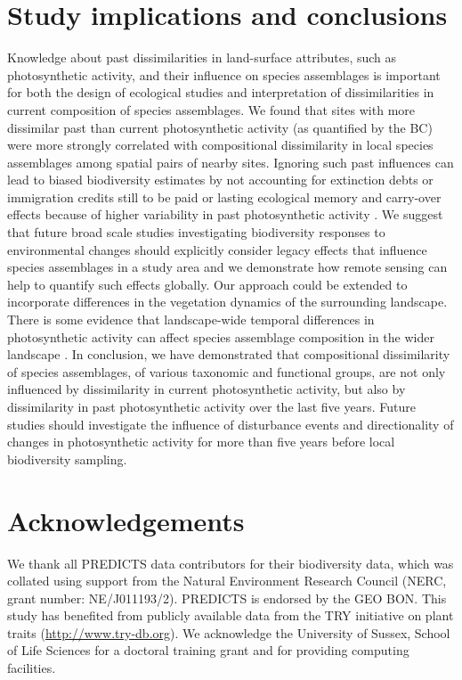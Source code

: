 \section{Study implications and conclusions}
Knowledge about past dissimilarities in land-surface attributes, such as photosynthetic activity, and their influence on species assemblages is important for both the design of ecological studies and interpretation of dissimilarities in current composition of species assemblages. We found that sites with more dissimilar past than current photosynthetic activity (as quantified by the BC) were more strongly correlated with compositional dissimilarity in local species assemblages among spatial pairs of nearby sites. Ignoring such past influences can lead to biased biodiversity estimates by not accounting for extinction debts or immigration credits still to be paid \citep[see ][]{Tilman1994} or lasting ecological memory and carry-over effects because of higher variability in past photosynthetic activity \citep{Rowhani2008,Cole2015,Ogle2015}. We suggest that future broad scale studies investigating biodiversity responses to environmental changes should explicitly consider legacy effects that influence species assemblages in a study area and we demonstrate how remote sensing can help to quantify such effects globally. Our approach could be extended to incorporate differences in the vegetation dynamics of the surrounding landscape. There is some evidence that landscape-wide temporal differences in photosynthetic activity can affect species assemblage composition in the wider landscape \citep{Manning2009,Fernandez2016}. In conclusion, we have demonstrated that compositional dissimilarity of species assemblages, of various taxonomic and functional groups, are not only influenced by dissimilarity in current photosynthetic activity, but also by dissimilarity in past photosynthetic activity over the last five years. Future studies should investigate the influence of disturbance events and directionality of changes in photosynthetic activity for more than five years before local biodiversity sampling.

\section{Acknowledgements}
We thank all PREDICTS data contributors for their biodiversity data, which was collated using support from the Natural Environment Research Council (NERC, grant number: NE/J011193/2). PREDICTS is endorsed by the GEO BON. This study has benefited from publicly available data from the TRY initiative on plant traits (\href{http://www.try-db.org}{http://www.try-db.org}). We acknowledge the University of Sussex, School of Life Sciences for a doctoral training grant and for providing computing facilities.

